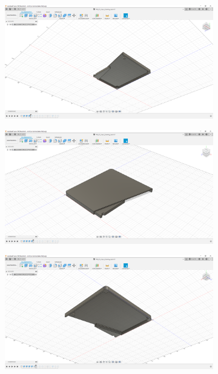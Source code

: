 \begin{figure}[h!tb]
\begin{subfigure}[t]{.3\linewidth}
		\caption[]{}
		\label{fig:design-back-03}
	\end{subfigure}
	\begin{subfigure}[t]{.3\linewidth}
		\includegraphics[width=\linewidth]{img/konstruktion_gehaeuse_hinten_004.png}
		\caption[]{}
		\label{fig:design-back-04}
	\end{subfigure}
	\begin{subfigure}[t]{.3\linewidth}
		\includegraphics[width=\linewidth]{img/konstruktion_gehaeuse_hinten_005.png}
		\caption[]{}
		\label{fig:design-back-05}
	\end{subfigure}
	\begin{subfigure}[t]{.3\linewidth}
		\includegraphics[width=\linewidth]{img/konstruktion_gehaeuse_hinten_006.png}

\end{subfigure}
\end{figure}
